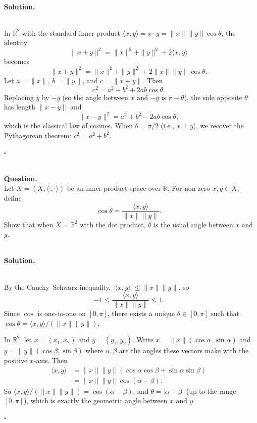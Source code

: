 \documentclass{article}
\begin{document}
\noindent\\
\textbf{Solution.}\\
\quad\\
\begin{mdframed}[linewidth=1pt]
In $\mathbb{R}^2$ with the standard inner product $\langle x, y \rangle = x \cdot y = \|x\|\|y\|\cos\theta$, the identity
\[
\|x+y\|^2 = \|x\|^2 + \|y\|^2 + 2\langle x, y \rangle
\]
becomes
\[
\|x+y\|^2 = \|x\|^2 + \|y\|^2 + 2\|x\|\|y\|\cos\theta.
\]
Let $a = \|x\|$, $b = \|y\|$, and $c = \|x+y\|$. Then
\[
c^2 = a^2 + b^2 + 2ab\cos\theta.
\]
Replacing $y$ by $-y$ (so the angle between $x$ and $-y$ is $\pi - \theta$), the side opposite $\theta$ has length $\|x - y\|$ and
\[
\|x - y\|^2 = a^2 + b^2 - 2ab\cos\theta,
\]
which is the classical law of cosines. When $\theta = \pi/2$ (i.e., $x \perp y$), we recover the Pythagorean theorem: $c^2 = a^2 + b^2$.

\hfill $\square$
\end{mdframed}

\bigskip

\hfill \break  $~\!\!$ \dotfill \medskip \\
\textbf{Question.}\\
Let $X = (X, \langle \cdot, \cdot \rangle)$ be an inner product space over $\mathbb{R}$. For non-zero $x, y \in X$, define
\[
\cos\theta = \frac{\langle x, y \rangle}{\|x\|\|y\|}.
\]
Show that when $X = \mathbb{R}^2$ with the dot product, $\theta$ is the usual angle between $x$ and $y$.

\noindent\\
\textbf{Solution.}\\
\quad\\
\begin{mdframed}[linewidth=1pt]
By the Cauchy--Schwarz inequality, $|\langle x,y\rangle| \le \|x\|\|y\|$, so
\[
-1 \le \frac{\langle x, y \rangle}{\|x\|\|y\|} \le 1.
\]
Since $\cos$ is one-to-one on $[0,\pi]$, there exists a unique $\theta \in [0,\pi]$ such that $\cos\theta = \langle x,y\rangle / (\|x\|\|y\|)$.

In $\mathbb{R}^2$, let $x = (x_1, x_2)$ and $y = (y_1, y_2)$. Write $x = \|x\|(\cos\alpha, \sin\alpha)$ and $y = \|y\|(\cos\beta, \sin\beta)$ where $\alpha, \beta$ are the angles these vectors make with the positive $x$-axis. Then
\begin{align*}
\langle x, y \rangle &= \|x\|\|y\|(\cos\alpha\cos\beta + \sin\alpha\sin\beta) \\
&= \|x\|\|y\|\cos(\alpha - \beta).
\end{align*}
So $\langle x,y\rangle / (\|x\|\|y\|) = \cos(\alpha - \beta)$, and $\theta = |\alpha - \beta|$ (up to the range $[0,\pi]$), which is exactly the geometric angle between $x$ and $y$.

\hfill $\square$
\end{mdframed}
\end{document}
